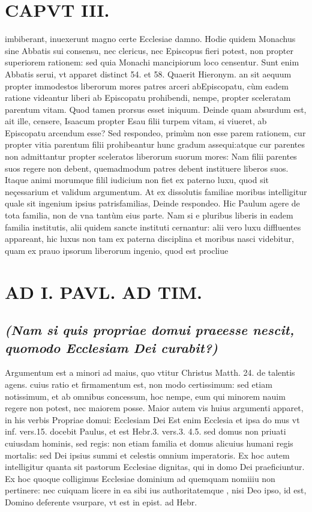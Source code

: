 \documentclass{article}
\begin{document}
\begin{pages}
\section*{CAPVT  III. }
\marginpar{[ p.13 ]}\pstart imbiberant, inuexerunt magno certe Ecclesiae damno. Hodie quidem Monachus sine Abbatis sui consensu, nec clericus, nec Episcopus fieri potest, non propter superiorem rationem: sed quia Monachi mancipiorum loco censentur. Sunt enim Abbatis serui, vt apparet distinct 54. et 58.  \pend\pstart Quaerit Hieronym. an sit aequum propter immodestos liberorum mores patres arceri abEpiscopatu, cùm eadem ratione videantur liberi ab Episcopatu prohibendi, nempe, propter sceleratam parentum vitam. Quod tamen prorsus esset iniquum. Deinde quam absurdum est, ait ille, censere, Isaacum propter Esau filii turpem vitam, si viueret, ab Episcopatu arcendum esse? Sed respondeo, primùm non esse parem rationem, cur propter vitia parentum filii prohibeantur hunc gradum assequi:atque cur parentes non admittantur propter sceleratos liberorum suorum mores: Nam filii parentes suos regere non debent, quemadmodum patres debent instituere liberos suos. Itaque animi morumque filil iudicium non fiet ex paterno luxu, quod sit neçessarium et validum argumentum. At ex dissolutis familiae moribus intelligitur quale sit ingenium ipsius patrisfamilias, Deinde respondeo. Hic Paulum agere de tota familia, non de vna tantùm eius parte. Nam si e pluribus liberis in eadem familia institutis, alii quidem sancte instituti cernantur: alii vero luxu diffluentes appareant, hic luxus non tam ex paterna disciplina et moribus nasci videbitur, quam ex prauo ipsorum liberorum ingenio, quod est procliue  \pend
\section*{AD I. PAVL. AD TIM. }
\marginpar{[ p.144 ]}
{}
\subsection*{\textit{(Nam si quis propriae domui praeesse nescit, quomodo Ecclesiam Dei curabit?) }}\pstart Argumentum est a minori ad maius, quo vtitur Christus Matth. 24. de talentis agens. cuius ratio et firmamentum est, non modo certissimum: sed etiam notissimum, et ab omnibus concessum, hoc nempe, eum qui minorem nauim regere non potest, nec maiorem posse. Maior autem vis huius argumenti apparet, in his verbis Propriae domui: Ecclesiam Dei Est enim Ecclesia et ipsa do mus vt inf. vers.15. docebit Paulus, et est Hebr.3. vers.3. 4.5. sed domus non priuati cuiusdam hominis, sed regis: non etiam familia et domus alicuius humani regis mortalis: sed Dei ipsius summi et celestis omnium imperatoris. Ex hoc autem intelligitur quanta sit pastorum Ecclesiae dignitas, qui in domo Dei praeficiuntur. Ex hoc quoque colligimus Ecclesiae dominium ad quemquam nomiiiu non pertinere: nec cuiquam licere in ea sibi ius authoritatemque , nisi Deo ipso, id est, Domino deferente vsurpare, vt est in epist. ad Hebr.  \pend
{}
{}

\end{pages}
\end{document}
